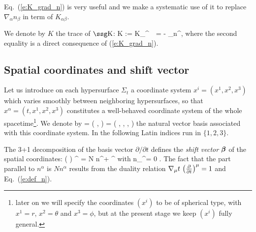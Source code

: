 Eq.~(\ref{e:K_grad_n}) is very useful and we make a systematic use
of it to replace $\nabla_\alpha n_\beta$ in term of $K_{\alpha\beta}$.

We denote by $K$ the trace of $\w{K}$:
\be
	K := K_\mu^{\ \,\mu} =  - \nabla_\mu n^\mu  ,
\ee
where the second equality is a direct consequence of (\ref{e:K_grad_n}).

\subsection{Spatial coordinates and shift vector}

Let us introduce on each hypersurface $\Sigma_t$ a coordinate
system $x^i = (x^1,x^2,x^3)$ 
which varies smoothly between neighboring
hypersurfaces, so that $x^\alpha=(t,x^1,x^2,x^3)$ constitutes a 
well-behaved coordinate system of the whole spacetime\footnote{later on 
we will specify the coordinates $(x^i)$ to be of 
spherical type, with $x^1=r$, $x^2=\theta$ and $x^3=\phi$, but
at the present stage we keep $(x^i)$ fully general.}.  
We denote by 
\be
     = \left( ,  \right) 
    = \left( , , ,  \right)
\ee
the natural vector basis associated with this coordinate system. 
In the following Latin indices run in $\{1,2,3\}$.
 
The 3+1 decomposition of the basis vector $\partial /\partial t$ defines
the {\em shift vector} $\mbox{\boldmath ${\beta}$}$ of the spatial coordinates:
\be \label{e:dsdt_ortho}
	\left(  \right) ^\alpha 
		= N n^\alpha + \beta^\alpha
			\qquad \mbox{with} \qquad n_\mu \beta^\mu = 0 .
\ee
The fact that the part parallel to $n^\alpha$ is $N n^\alpha$
results from the duality relation 
$\nabla_\mu t \, \left( \frac{\partial }{\partial t} \right) ^\mu = 1$ and
Eq.~(\ref{e:def_n}). 

